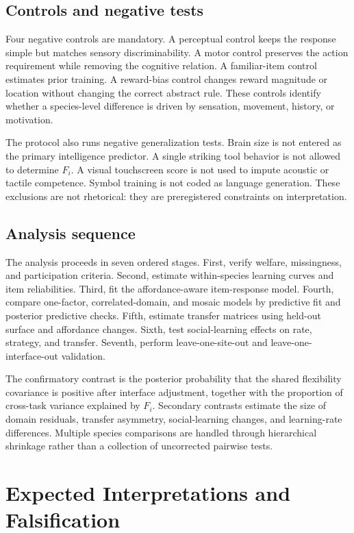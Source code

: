\documentclass[conference]{IEEEtran}
\begin{document}
\subsection{Controls and negative tests}
Four negative controls are mandatory. A perceptual control keeps the response simple but matches sensory discriminability. A motor control preserves the action requirement while removing the cognitive relation. A familiar-item control estimates prior training. A reward-bias control changes reward magnitude or location without changing the correct abstract rule. These controls identify whether a species-level difference is driven by sensation, movement, history, or motivation.

The protocol also runs negative generalization tests. Brain size is not entered as the primary intelligence predictor. A single striking tool behavior is not allowed to determine $F_i$. A visual touchscreen score is not used to impute acoustic or tactile competence. Symbol training is not coded as language generation. These exclusions are not rhetorical: they are preregistered constraints on interpretation.

\subsection{Analysis sequence}
The analysis proceeds in seven ordered stages. First, verify welfare, missingness, and participation criteria. Second, estimate within-species learning curves and item reliabilities. Third, fit the affordance-aware item-response model. Fourth, compare one-factor, correlated-domain, and mosaic models by predictive fit and posterior predictive checks. Fifth, estimate transfer matrices using held-out surface and affordance changes. Sixth, test social-learning effects on rate, strategy, and transfer. Seventh, perform leave-one-site-out and leave-one-interface-out validation.

The confirmatory contrast is the posterior probability that the shared flexibility covariance is positive after interface adjustment, together with the proportion of cross-task variance explained by $F_i$. Secondary contrasts estimate the size of domain residuals, transfer asymmetry, social-learning changes, and learning-rate differences. Multiple species comparisons are handled through hierarchical shrinkage rather than a collection of uncorrected pairwise tests.

\section{Expected Interpretations and Falsification}
\end{document}
